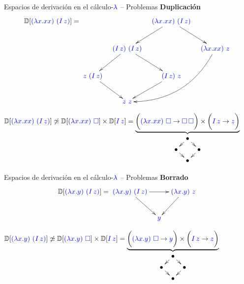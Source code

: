 \documentclass{beamer}
\newcommand{\cLam}[1]{{\color{darkBlue} #1}}
\newcommand{\clambda}{\cLam{\lambda}}
\begin{document}
\begin{frame}{Espacios de derivación en el cálculo-$\clambda$ -- Problemas}
\textbf{Duplicación}
\[\ulbDeriv{\cLam{(\lam{x}{x x})\ (I\, z)}} =
\xymatrix@C=0.3cm{
& & \cLam{(\lam{x}{x x})\ (I\, z)} \ar[dr] \ar[dl] & \\
& \cLam{(I\, z)\ (I\, z)} \ar[dr] \ar[dl] & & \cLam{(\lam{x}{x x})\ z} \ar@/^2.0pc/[ddll]\\
\cLam{z\ (I\, z)} \ar[dr] & & \cLam{(I\, z)\ z} \ar[dl] & \\
 & \cLam{z\ z} & & \\
}
\]

{\footnotesize
$\ulbDeriv{\cLam{(\lam{x}{x x})\ (I\, z)}}
\not\simeq
\ulbDeriv{\cLam{(\lam{x}{x x})\ \conbase}} \times \ulbDeriv{\cLam{I\, z}}
=
\underbrace{\bigg(\cLam{(\lam{x}{x x})\ \conbase} \to \cLam{\conbase \, \conbase}\bigg) \times \bigg(\cLam{I\, z} \to \cLam{z}\bigg)}_{\xymatrix@=0.2cm{
& \bullet \ar[dr] \ar[dl] & \\
\bullet \ar[dr] & & \bullet \ar[dl] \\
& \bullet &}}$
}
\end{frame}

\begin{frame}{Espacios de derivación en el cálculo-$\clambda$ -- Problemas}
\textbf{Borrado}
\[\ulbDeriv{\cLam{(\lam{x}{y})\ (I\, z)}} =
\xymatrix@C=0.3cm{
\cLam{(\lam{x}{y})\ (I\, z)} \ar[rr] \ar[dr] & & \cLam{(\lam{x}{y})\ z} \ar[dl]\\
& \cLam{y} & \\
}
\]

{\footnotesize
$\ulbDeriv{\cLam{(\lam{x}{y})\ (I\, z)}}
\not\simeq
\ulbDeriv{\cLam{(\lam{x}{y})\ \conbase}} \times \ulbDeriv{\cLam{I\, z}}
=
\underbrace{\bigg(\cLam{(\lam{x}{y})\ \conbase} \to \cLam{y}\bigg) \times \bigg(\cLam{I\, z} \to \cLam{z}\bigg)}_{\xymatrix@=0.2cm{
& \bullet \ar[dr] \ar[dl] & \\
\bullet \ar[dr] & & \bullet \ar[dl] \\
& \bullet &}}$
}
\end{frame}
\end{document}
